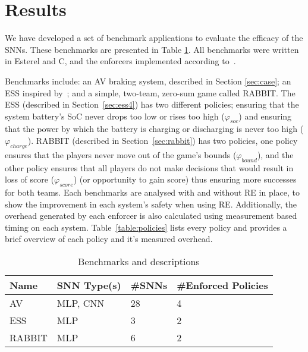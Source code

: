 
\section{Results}
\label{sec:resultsc4}

We have developed a set of benchmark applications to evaluate the efficacy of the \acp{SNN}.
These benchmarks are presented in Table \ref{table:benchmarks4}.
All benchmarks were written in Esterel and C, and the enforcers implemented according to~\cite{recps}.

Benchmarks include: an \acf{AV} braking system, described in Section \ref{sec:case}; an \acf{ESS} inspired by~\cite{chaudhari2017hybrid}; and a simple, two-team, zero-sum game called RABBIT.
The \ac{ESS} (described in Section~\ref{sec:ess4}) has two different policies; ensuring that the system battery's \ac{SoC} never drops too low or rises too high  ($\varphi_{soc}$) and ensuring that the power by which the battery is charging or discharging is never too high ($\varphi_{charge}$).
RABBIT (described in Section~\ref{sec:rabbit}) has two policies, one policy ensures that the players never move out of the game's bounds ($\varphi_{bound}$), and the other policy ensures that all players do not make decisions that would result in loss of score ($\varphi_{score}$) (or opportunity to gain score) thus ensuring more successes for both teams.
Each benchmarks are analysed with and without \ac{RE} in place, to show the improvement in each system's safety when using \ac{RE}.
Additionally, the overhead generated by each enforcer is also calculated using measurement based timing on each system. 
Table~\ref{table:policies} lists every policy and provides a brief overview of each policy and it's measured overhead. 

\begin{table}[H]
	\centering
	\caption{Benchmarks and descriptions}
	\label{table:benchmarks4}
	\begin{tabular}{@{}|l|l|l|l|@{}}
		\hline
		Name & \ac{SNN} Type(s) & \#\acp{SNN} & \#Enforced Policies \\ \hline
		\acs{AV} & \ac{MLP}, \ac{CNN}  & 28 & 4 \\
		\acs{ESS} & \ac{MLP} & 3 & 2 \\
		RABBIT & \ac{MLP}  & 6 & 2 \\
		\hline
	\end{tabular}
\end{table}

